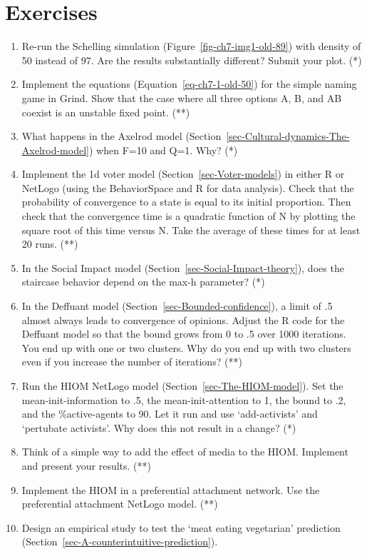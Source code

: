 \documentclass[
  a4paper,
  DIV=11,
  numbers=noendperiod,
  oneside]{scrreprt}
\begin{document}
\hypertarget{sec-Exercises}{%
\section{Exercises}\label{sec-Exercises}}

\begin{enumerate}
\def\labelenumi{\arabic{enumi})}
\item
  Re-run the Schelling simulation (Figure~\ref{fig-ch7-img1-old-89})
  with density of 50 instead of 97. Are the results substantially
  different? Submit your plot. (*)
\item
  Implement the equations (Equation~\ref{eq-ch7-1-old-50}) for the
  simple naming game in Grind. Show that the case where all three
  options A, B, and AB coexist is an unstable fixed point. (**)
\item
  What happens in the Axelrod model
  (Section~\ref{sec-Cultural-dynamics-The-Axelrod-model}) when F=10 and
  Q=1. Why? (*)
\item
  Implement the 1d voter model (Section~\ref{sec-Voter-models}) in
  either R or NetLogo (using the BehaviorSpace and R for data analysis).
  Check that the probability of convergence to a state is equal to its
  initial proportion. Then check that the convergence time is a
  quadratic function of N by plotting the square root of this time
  versus N. Take the average of these times for at least 20 runs. (**)
\item
  In the Social Impact model (Section~\ref{sec-Social-Impact-theory}),
  does the staircase behavior depend on the max-h parameter? (*)
\item
  In the Deffuant model (Section~\ref{sec-Bounded-confidence}), a limit
  of .5 almost always leads to convergence of opinions. Adjust the R
  code for the Deffuant model so that the bound grows from 0 to .5 over
  1000 iterations. You end up with one or two clusters. Why do you end
  up with two clusters even if you increase the number of iterations?
  (**)
\item
  Run the HIOM NetLogo model (Section~\ref{sec-The-HIOM-model}). Set the
  mean-init-information to .5, the mean-init-attention to 1, the bound
  to .2, and the \%active-agents to 90. Let it run and use
  `add-activists' and `pertubate activists'. Why does this not result in
  a change? (*)
\item
  Think of a simple way to add the effect of media to the HIOM.
  Implement and present your results. (**)
\item
  Implement the HIOM in a preferential attachment network. Use the
  preferential attachment NetLogo model. (**)
\item
  Design an empirical study to test the `meat eating vegetarian'
  prediction (Section~\ref{sec-A-counterintuitive-prediction}).
\end{enumerate}
\end{document}
